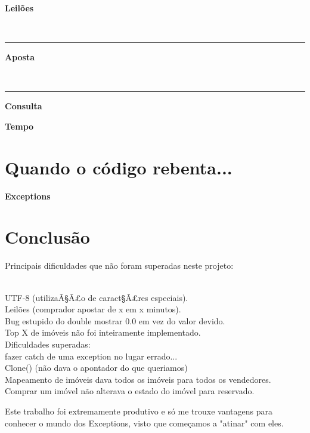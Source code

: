 \documentclass[12pt]{article}
\newenvironment{code}                    
{\textbf{
} \hspace{1cm} \hrulefill \\ 
\smallskip 
\begin{center}
\begin{minipage}{0.9\textwidth} 
\begin{alltt}\small}
{\end{alltt}
\end{minipage}
\end{center}
\hrule\smallskip
}
\begin{document}
\textbf{Leilões}

\begin{code}

\end{code}


\pagebreak

\textbf{Aposta}

\begin{code}

\end{code}

\textbf{Consulta}

\textbf{Tempo}

\pagebreak

\section{Quando o código rebenta...}

\textbf{Exceptions}
\pagebreak

 
\section{Conclusão}

Principais dificuldades que não foram superadas neste projeto:

~\\
UTF-8 (utilizaÃ§Ã£o de caract§Ã£res especiais).
~\\
Leilões (comprador apostar de x em x minutos).
~\\
Bug estupido do double mostrar 0.0 em vez do valor devido.
~\\
Top X de imóveis não foi inteiramente implementado.
~\\

Dificuldades superadas:
~\\
fazer catch de uma exception no lugar errado...
~\\
Clone() (não dava o apontador do que queriamos)
~\\
Mapeamento de imóveis dava todos os imóveis para todos os vendedores.
~\\
Comprar um imóvel não alterava o estado do imóvel para reservado.


Este trabalho foi extremamente produtivo e só me trouxe vantagens para conhecer o mundo dos Exceptions, visto que começamos a "atinar" com eles.
\end{document}
